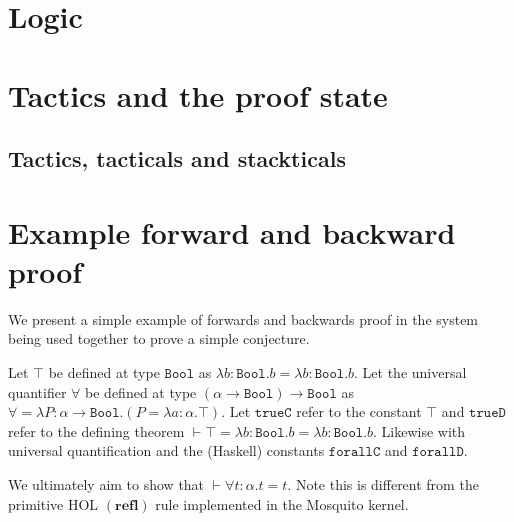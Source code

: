 \documentclass{llncs}
\newcommand{\lam}[1]{\lambda{#1}.}
\newcommand{\mosquito}{Mosquito\xspace}
\newcommand{\rulefont}[1]{\ensuremath{(\mathbf{#1})}}
\begin{document}
\section{Logic}
\label{sect.logic}

\section{Tactics and the proof state}
\label{sect.tactics.proof.state}

\subsection{Tactics, tacticals and stackticals}
\label{subsect.tactics.tacticals.modifying.proof.state}

\section{Example forward and backward proof}
\label{subsect.example.forward.backward.proof}

We present a simple example of forwards and backwards proof in the system being used together to prove a simple conjecture.

Let $\top$ be defined at type $\mathtt{Bool}$ as $\lam{b{:}\mathtt{Bool}}b = \lam{b{:}\mathtt{Bool}}b$.
Let the universal quantifier $\forall$ be defined at type $(\alpha \rightarrow \mathtt{Bool}) \rightarrow \mathtt{Bool}$ as $\forall = \lam{P{:}\alpha \rightarrow \mathtt{Bool}}(P = \lam{a:{\alpha}}\top)$.
Let $\mathtt{trueC}$ refer to the constant $\top$ and $\mathtt{trueD}$ refer to the defining theorem $\vdash \top = \lam{b{:}\mathtt{Bool}}b = \lam{b{:}\mathtt{Bool}}b$.
Likewise with universal quantification and the (Haskell) constants $\mathtt{forallC}$ and $\mathtt{forallD}$.

We ultimately aim to show that $\vdash \forall{t{:}\alpha}. t = t$.
Note this is different from the primitive HOL \rulefont{refl} rule implemented in the \mosquito kernel.
\end{document}
